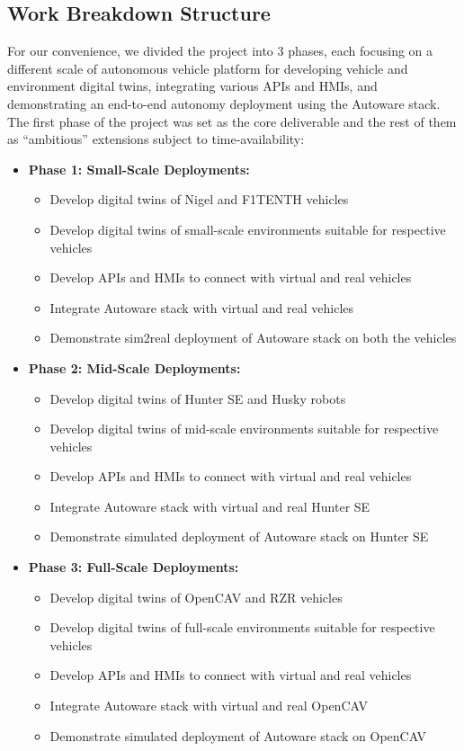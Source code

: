 \hypertarget{Work Breakdown Structure}{%
\subsection{Work Breakdown Structure}\label{Work Breakdown Structure}}

For our convenience, we divided the project into 3 phases, each focusing on a different scale of autonomous vehicle platform for developing vehicle and environment digital twins, integrating various APIs and HMIs, and demonstrating an end-to-end autonomy deployment using the Autoware stack. The first phase of the project was set as the core deliverable and the rest of them as ``ambitious'' extensions subject to time-availability:
\begin{itemize}
    \item \textbf{Phase 1: Small-Scale Deployments:}
    \begin{itemize}
    \item Develop digital twins of Nigel and F1TENTH vehicles
    \item Develop digital twins of small-scale environments suitable for respective vehicles
    \item Develop APIs and HMIs to connect with virtual and real vehicles
    \item Integrate Autoware stack with virtual and real vehicles
    \item Demonstrate sim2real deployment of Autoware stack on both the vehicles
    \end{itemize}

    \item \textbf{Phase 2: Mid-Scale Deployments:}
    \begin{itemize}
    \item Develop digital twins of Hunter SE and Husky robots
    \item Develop digital twins of mid-scale environments suitable for respective vehicles
    \item Develop APIs and HMIs to connect with virtual and real vehicles
    \item Integrate Autoware stack with virtual and real Hunter SE
    \item Demonstrate simulated deployment of Autoware stack on Hunter SE
    \end{itemize}

    \item \textbf{Phase 3: Full-Scale Deployments:}
    \begin{itemize}
    \item Develop digital twins of OpenCAV and RZR vehicles
    \item Develop digital twins of full-scale environments suitable for respective vehicles
    \item Develop APIs and HMIs to connect with virtual and real vehicles
    \item Integrate Autoware stack with virtual and real OpenCAV
    \item Demonstrate simulated deployment of Autoware stack on OpenCAV
    \end{itemize}
\end{itemize}

